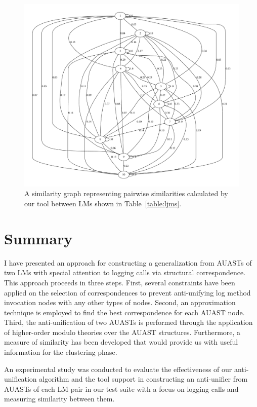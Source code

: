\begin{figure} [H]
  \centering\includegraphics [width = \textwidth]{graphviz/au.pdf}
  \caption{A similarity graph representing pairwise similarities calculated by our tool between LMs shown in Table~\ref{table:ljms}.}
  \label{fig:au_graph}
\end{figure}




\section{Summary} \label{meth1-summary}
I have presented an approach for constructing a generalization from AUASTs of two LMs with special attention to logging calls via structural correspondence. This approach proceeds in three steps. First, several constraints have been applied on the selection of correspondences to prevent anti-unifying log method invocation nodes with any other types of nodes. Second, an approximation technique is employed to find the best correspondence for each AUAST node. Third, the anti-unification of two AUASTs is performed through the application of higher-order modulo theories over the AUAST structures. Furthermore, a measure of similarity has been developed that would provide us with useful information for the clustering phase.

An experimental study was conducted to evaluate the effectiveness of our anti-unification algorithm and the tool support in constructing an anti-unifier from AUASTs of each LM pair in our test suite with a focus on logging calls and measuring similarity between them.







